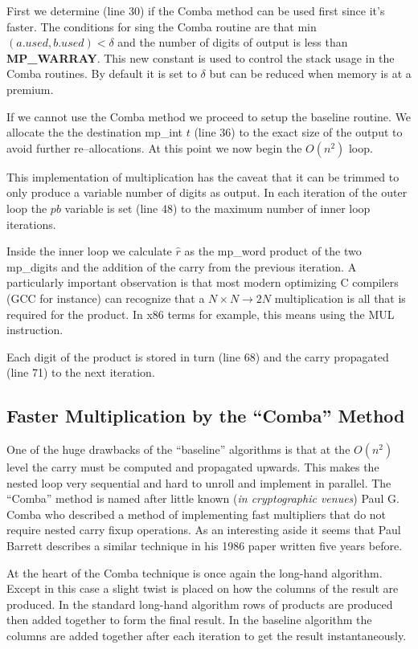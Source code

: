 \documentclass[b5paper]{book}
\begin{document}
First we determine (line 30) if the Comba method can be used first since it's faster.  The conditions for 
sing the Comba routine are that min$(a.used, b.used) < \delta$ and the number of digits of output is less than 
\textbf{MP\_WARRAY}.  This new constant is used to control the stack usage in the Comba routines.  By default it is 
set to $\delta$ but can be reduced when memory is at a premium.

If we cannot use the Comba method we proceed to setup the baseline routine.  We allocate the the destination mp\_int
$t$ (line 36) to the exact size of the output to avoid further re--allocations.  At this point we now 
begin the $O(n^2)$ loop.

This implementation of multiplication has the caveat that it can be trimmed to only produce a variable number of
digits as output.  In each iteration of the outer loop the $pb$ variable is set (line 48) to the maximum 
number of inner loop iterations.  

Inside the inner loop we calculate $\hat r$ as the mp\_word product of the two mp\_digits and the addition of the
carry from the previous iteration.  A particularly important observation is that most modern optimizing 
C compilers (GCC for instance) can recognize that a $N \times N \rightarrow 2N$ multiplication is all that 
is required for the product.  In x86 terms for example, this means using the MUL instruction.

Each digit of the product is stored in turn (line 68) and the carry propagated (line 71) to the 
next iteration.

\subsection{Faster Multiplication by the ``Comba'' Method}

One of the huge drawbacks of the ``baseline'' algorithms is that at the $O(n^2)$ level the carry must be 
computed and propagated upwards.  This makes the nested loop very sequential and hard to unroll and implement 
in parallel.  The ``Comba'' \cite{COMBA} method is named after little known (\textit{in cryptographic venues}) Paul G. 
Comba who described a method of implementing fast multipliers that do not require nested carry fixup operations.  As an 
interesting aside it seems that Paul Barrett describes a similar technique in his 1986 paper \cite{BARRETT} written 
five years before.

At the heart of the Comba technique is once again the long-hand algorithm.  Except in this case a slight 
twist is placed on how the columns of the result are produced.  In the standard long-hand algorithm rows of products 
are produced then added together to form the final result.  In the baseline algorithm the columns are added together 
after each iteration to get the result instantaneously.  
\end{document}
